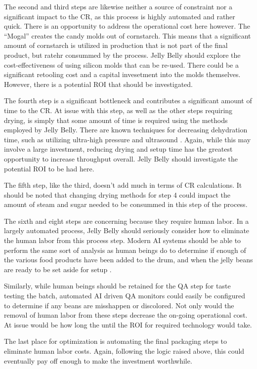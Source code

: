 The second and third steps are likewise neither a source of constraint nor a significant impact to the CR, as this process is highly automated and rather quick. There is an opportunity to address the operational cost here however. The ``Mogal'' creates the candy molds out of cornstarch. This means that a significant amount of cornstarch is utilized in production that is not part of the final product, but ratehr consummed by the process. Jelly Belly should explore the cost-effectiveness of using silicon molds that can be re-used. There could be a significant retooling cost and a capital invesetment into the molds themselves. However, there is a potential ROI that should be investigated.

The fourth step is a significant bottleneck and contributes a significant amount of time to the CR. At issue with this step, as well as the other steps requiring drying, is simply that some amount of time is required using the methods employed by Jelly Belly. There are known techniques for decreasing dehydration time, such as utilizing ultra-high pressure and ultrasound \parencite{zhangEffectsUltrahighPressure2020}. Again, while this may involve a large investment, reducing drying and setup time has the greatest opportunity to increase throughput overall. Jelly Belly should investigate the potential ROI to be had here.

The fifth step, like the third, doesn't add much in terms of CR calculations. It should be noted that changing drying methods for step 4 could impact the amount of steam and sugar needed to be consummed in this step of the process.

The sixth and eight steps are concerning because they require human labor. In a largely automated process, Jelly Belly should seriously consider how to eliminate the human labor from this process step. Modern AI systems should be able to perform the same sort of analysis as human beings do to determine if enough of the various food products have been added to the drum, and when the jelly beans are ready to be set aside for setup \parencite{pothArtificialIntelligenceHelps2019}.

Similarly, while human beings should be retained for the QA step for taste testing the batch, automated AI driven QA monitors could easily be configured to determine if any beans are misshappen or discolored. Not only would the removal of human labor from these steps decrease the on-going operational cost. At issue would be how long the until the ROI for required technology would take.

The last place for optimization is automating the final packaging steps to eliminate human labor costs. Again, following the logic raised above, this could eventually pay off enough to make the investment worthwhile.
